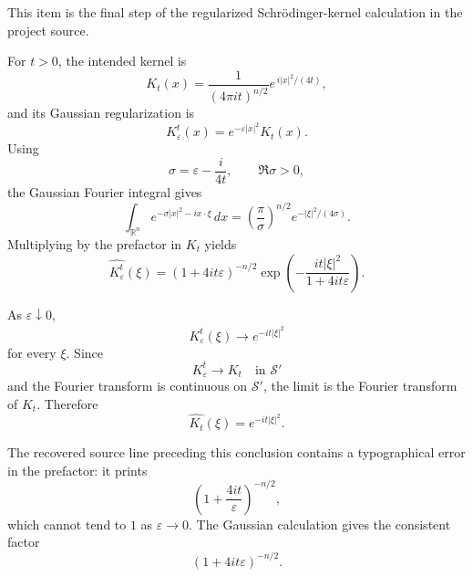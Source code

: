 \begin{solution}
This item is the final step of the regularized Schrödinger-kernel calculation in the project
source.

For \(t>0\), the intended kernel is
\[
K_t(x)
=
\frac1{(4\pi i t)^{n/2}}
e^{\,i|x|^2/(4t)},
\]
and its Gaussian regularization is
\[
K_\varepsilon^t(x)
=
e^{-\varepsilon|x|^2}K_t(x).
\]
Using
\[
\sigma
=
\varepsilon-\frac{i}{4t},
\qquad
\Re\sigma>0,
\]
the Gaussian Fourier integral gives
\[
\int_{\mathbb R^n}
e^{-\sigma|x|^2-i x\cdot\xi}\,dx
=
\left(\frac{\pi}{\sigma}\right)^{n/2}
e^{-|\xi|^2/(4\sigma)}.
\]
Multiplying by the prefactor in \(K_t\) yields
\[
\boxed{
\widehat{K_\varepsilon^t}(\xi)
=
(1+4it\varepsilon)^{-n/2}
\exp\left(
-\frac{it|\xi|^2}{1+4it\varepsilon}
\right).
}
\]

As \(\varepsilon\downarrow0\),
\[
\widehat{K_\varepsilon^t}(\xi)
\longrightarrow
e^{-it|\xi|^2}
\]
for every \(\xi\). Since
\[
K_\varepsilon^t\to K_t
\quad\text{in }\mathcal S'
\]
and the Fourier transform is continuous on \(\mathcal S'\), the limit is the Fourier transform
of \(K_t\). Therefore
\[
\boxed{
\widehat{K_t}(\xi)
=
e^{-it|\xi|^2}.
}
\]

The recovered source line preceding this conclusion contains a typographical error in the
prefactor: it prints
\[
\left(1+\frac{4it}{\varepsilon}\right)^{-n/2},
\]
which cannot tend to \(1\) as \(\varepsilon\to0\). The Gaussian calculation gives the
consistent factor
\[
(1+4it\varepsilon)^{-n/2}.
\]
\end{solution}



